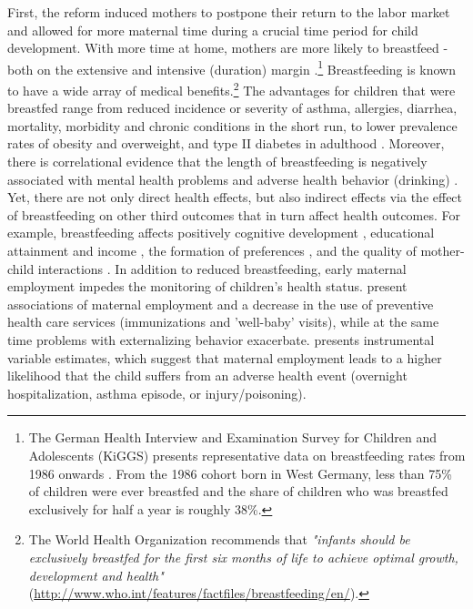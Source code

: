 \documentclass[11pt, a4paper,draft]{article} %
\begin{document}
First, the reform induced mothers to postpone their return to the labor market and allowed for more maternal time during a crucial time period for child development. With more time at home, mothers are more likely to breastfeed - both on the extensive and intensive (duration) margin \citep{baker2008maternal,berger2005earlymaternal}.\footnote{The German Health Interview and Examination Survey for Children and Adolescents (KiGGS) presents representative data on breastfeeding rates from 1986 onwards \citep{lange2007breastfeeding}. From the 1986 cohort born in West Germany, less than 75\% of children were ever breastfed and the share of children who was breastfed exclusively for half a year is roughly 38\%.} Breastfeeding is known to have a wide array of medical benefits.\footnote{The World Health Organization recommends that \textit{"infants should be exclusively breastfed for the first six months of life to achieve optimal growth, development and health"} (\href{http://www.who.int/features/factfiles/breastfeeding/en/}{http://www.who.int/features/factfiles/breastfeeding/en/}).} The advantages for children that were breastfed range from reduced incidence or severity of asthma, allergies, diarrhea, mortality, morbidity and chronic conditions in the short run, to lower prevalence rates of obesity and overweight, and type II diabetes in adulthood \citep{ruhm2000parental, victora2016breastfeeding}. Moreover, there is correlational evidence that the length of breastfeeding is negatively associated with mental health problems and adverse health behavior (drinking) \citep{oddy2010longterm,falk2016early}. Yet, there are not only direct health effects, but also indirect effects via the effect of breastfeeding on other third outcomes that in turn affect health outcomes. For example, breastfeeding affects positively cognitive development \citep{albagli2018}, educational attainment and income \citep{victoria2015association}, the formation of preferences \citep{falk2016early}, and the quality of mother-child interactions \citep{papp2014longitudinal}. \newline 
In addition to reduced breastfeeding, early maternal employment impedes the monitoring of children's health status. \cite{berger2005earlymaternal} present associations of maternal employment and a decrease in the use of preventive health care services (immunizations and 'well-baby' visits), while at the same time problems with externalizing behavior exacerbate. \cite{morrill2011} presents instrumental variable estimates, which suggest that maternal employment leads to a higher likelihood that the child suffers from an adverse health event (overnight hospitalization, asthma episode, or injury/poisoning).\newline 
\end{document}
